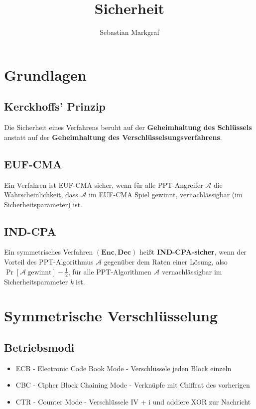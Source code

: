 \documentclass[10pt,a4paper]{article}
\author{Sebastian Markgraf}
\title{Sicherheit}
\begin{document}
	{\let\newpage\relax\maketitle}
	\tableofcontents
	\newpage
	\setcounter{page}{1}

        \section{Grundlagen}
        \subsection{Kerckhoffs' Prinzip}
        Die Sicherheit eines Verfahrens beruht auf der \textbf{Geheimhaltung des Schlüssels}
        anstatt auf der \textbf{Geheimhaltung des Verschlüsselsungsverfahrens}.

        \subsection{EUF-CMA}
        Ein Verfahren ist EUF-CMA sicher, wenn für alle PPT-Angreifer \(\mathcal{A}\) die Wahrscheinlichkeit,
        dass \(\mathcal{A}\) im EUF-CMA Spiel gewinnt, vernachlässigbar (im Sicherheitsparameter) ist.

        \subsection{IND-CPA}
        Ein symmetrisches Verfahren \((\mathbf{Enc}, \mathbf{Dec})\) heißt \textbf{IND-CPA-sicher}, wenn der Vorteil des
        PPT-Algorithmus \(\mathcal{A}\) gegenüber dem Raten einer Lösung, also
        \(\Pr\left[\mathcal{A}\ \text{gewinnt}\right] - \frac{1}{2}\), für alle
        PPT-Algorithmen \(\mathcal{A}\) vernachlässigbar im Sicherheitsparameter \textit{k} ist.
        \newpage
        
	\section{Symmetrische Verschlüsselung}
        \subsection{Betriebsmodi}
        \begin{itemize}
        \item ECB - Electronic Code Book Mode - Verschlüssele jeden Block einzeln
        \item CBC - Cipher Block Chaining Mode - Verknüpfe mit Chiffrat des vorherigen
        \item CTR - Counter Mode - Verschlüssele IV + i und addiere XOR zur Nachricht
        \end{itemize}
        \newpage
        
\end{document}
